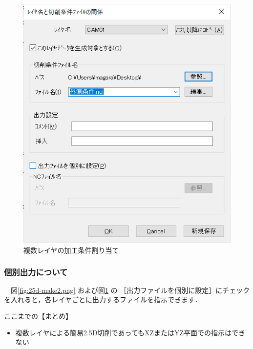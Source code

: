 \begin{figure}[H]
\centering
\includegraphics[scale=0.7]{No3/fig/25d-make5.png}
\caption{複数レイヤの加工条件割り当て}
\label{fig:25d-make5.png}
\end{figure}

\subsubsection{個別出力について}
　図\ref{fig:25d-make2.png} および図\ref{fig:25d-make5.png} の
［出力ファイルを個別に設定］にチェックを入れると，各レイヤごとに出力するファイルを指示できます．

\newpage
\begin{itembox}[l]{ここまでの【まとめ】}
\begin{itemize}
\item 複数レイヤによる簡易2.5D切削であってもXZまたはYZ平面での指示はできない
\end{itemize}
\end{itembox}
